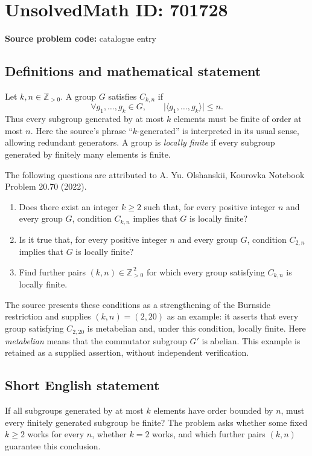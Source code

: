 \documentclass[11pt]{article}
\newcommand{\Z}{\mathbb{Z}}
\begin{document}
\section*{UnsolvedMath ID: 701728}
\textbf{Source problem code:} catalogue entry
\subsection{Definitions and mathematical statement}
Let \(k,n\in\Z_{>0}\). A group \(G\) satisfies \(C_{k,n}\) if
\[
\forall g_1,\ldots,g_k\in G,\qquad
\bigl|\langle g_1,\ldots,g_k\rangle\bigr|\le n.
\]
Thus every subgroup generated by at most \(k\) elements must be finite of order at most \(n\). Here the source's phrase ``\(k\)-generated'' is interpreted in its usual sense, allowing redundant generators. A group is \emph{locally finite} if every subgroup generated by finitely many elements is finite.

The following questions are attributed to A. Yu. Olshanskii, Kourovka Notebook Problem 20.70 (2022).
\begin{enumerate}
\item[(a)] Does there exist an integer \(k\ge2\) such that, for every positive integer \(n\) and every group \(G\), condition \(C_{k,n}\) implies that \(G\) is locally finite?
\item[(b)] Is it true that, for every positive integer \(n\) and every group \(G\), condition \(C_{2,n}\) implies that \(G\) is locally finite?
\item[(c)] Find further pairs \((k,n)\in\Z_{>0}^{\,2}\) for which every group satisfying \(C_{k,n}\) is locally finite.
\end{enumerate}
The source presents these conditions as a strengthening of the Burnside restriction and supplies \((k,n)=(2,20)\) as an example: it asserts that every group satisfying \(C_{2,20}\) is metabelian and, under this condition, locally finite. Here \emph{metabelian} means that the commutator subgroup \(G'\) is abelian. This example is retained as a supplied assertion, without independent verification.
\subsection{Short English statement}
If all subgroups generated by at most \(k\) elements have order bounded by \(n\), must every finitely generated subgroup be finite? The problem asks whether some fixed \(k\ge2\) works for every \(n\), whether \(k=2\) works, and which further pairs \((k,n)\) guarantee this conclusion.
\end{document}
